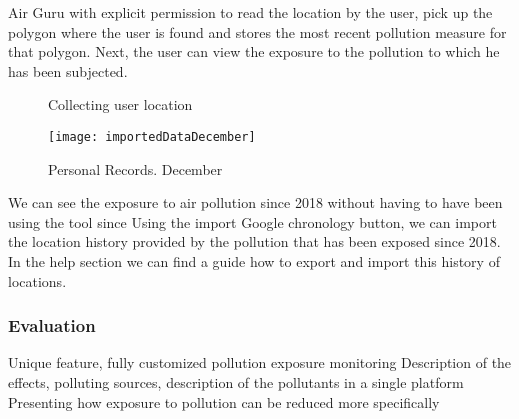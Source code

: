 Air Guru with explicit permission to read the location by the user, pick up the polygon where
the user is found and stores the most recent pollution measure for that polygon. Next, the
user can view the exposure to the pollution to which he has been subjected.
\begin{figure}[ht]
    \centering 
      \caption{Collecting user location}
    \end{figure}
    \begin{figure}[ht]
        \centering
        \texttt{[image: importedDataDecember]}
        \caption{Personal Records. December}
    \end{figure}
    We can see the exposure to air pollution since 2018 without having to have been using the tool since
    Using the import Google chronology button, we can import the location history provided by the
    pollution that has been exposed since 2018. In the help section we can find a guide how to
    export and import this history of locations.
\subsubsection*{Evaluation}  
\begin{itemize}
    \done Unique feature, fully customized pollution exposure monitoring
    \done Description of the effects, polluting sources, description of the pollutants in a single platform
    \crossed Presenting how exposure to pollution can be reduced more specifically
    
\end{itemize}